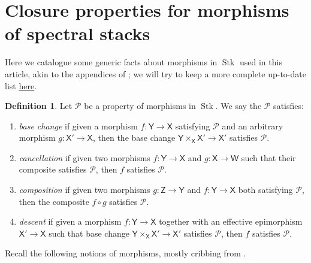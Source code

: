 \documentclass[11pt, a4paper]{article}
\newcommand{\1}{\mathbf{1}}
\DeclareMathOperator{\Stk}{Stk}
\newcommand{\calP}{\mathcal{P}}
\newcommand{\sfW}{\mathsf{W}}
\newcommand{\X}{\mathsf{X}}
\newcommand{\Y}{\mathsf{Y}}
\newcommand{\sfZ}{\mathsf{Z}}
\theoremstyle{plain}
\theoremstyle{definition}
\newtheorem{mydef}[equation]{Definition}
\theoremstyle{remark}\numberwithin{equation}{section}
\begin{document}
\appendix
\section{Closure properties for morphisms of spectral stacks}\label{appendix}
Here we catalogue some generic facts about morphisms in $\Stk$ used in this article, akin to the appendices of \cite{hortzwedhorn}; we will try to keep a more complete up-to-date list \href{https://www.jmdavies.org/properties-of-morphisms-in-sag}{here}.

\begin{mydef}\label{df:propertiy_of_morphisms}
    Let $\calP$ be a property of morphisms in $\Stk$. We say the $\calP$ satisfies:
    \begin{enumerate}
        \item \emph{base change} if given a morphism $f\colon \Y \to \X$ satisfying $\calP$ and an arbitrary morphism $g\colon \X' \to \X$, then the base change $\Y \times_\X \X' \to \X'$ satisfies $\calP$.
        \item \emph{cancellation} if given two morphisms $f \colon \Y \to \X$ and $g\colon \X \to \sfW$ such that their composite satisfies $\calP$, then $f$ satisfies $\calP$.
        \item \emph{composition} if given two morphisms $g\colon \sfZ \to \Y$ and $f\colon \Y \to \X$ both satisfying $\calP$, then the composite $f\circ g$ satisfies $\calP$.
        \item \emph{descent} if given a morphism $f \colon \Y \to \X$ together with an effective epimorphism $\X' \to \X$ such that base change $\Y \times_\X \X' \to \X'$ satisfies $\calP$, then $f$ satisfies $\calP$.
    \end{enumerate}
\end{mydef}

Recall the following notions of morphisms, mostly cribbing from \cite{reconstruction}.
\end{document}
